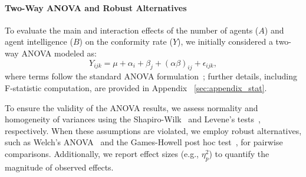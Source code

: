 \documentclass[11pt]{article}
\begin{document}
\paragraph{Two-Way ANOVA and Robust Alternatives}
To evaluate the main and interaction effects of the number of agents (\(A\)) and agent intelligence (\(B\)) on the conformity rate (\(Y\)), we initially considered a two-way ANOVA modeled as:
\[
Y_{ijk} = \mu + \alpha_i + \beta_j + (\alpha\beta)_{ij} + \epsilon_{ijk},
\]
where terms follow the standard ANOVA formulation~\citep{scheffe1999analysis}; further details, including F-statistic computation, are provided in Appendix ~\ref{sec:appendix_stat}.  







To ensure the validity of the ANOVA results, we assess normality and homogeneity of variances using the Shapiro-Wilk~\citep{shaphiro1965analysis} and Levene's tests~\citep{levene1960robust}, respectively. When these assumptions are violated, we employ robust alternatives, such as Welch's ANOVA~\citep{welch1951comparison} and the Games-Howell post hoc test~\citep{games1976pairwise}, for pairwise comparisons. Additionally, we report effect sizes (e.g., \(\eta_p^2\)) to quantify the magnitude of observed effects.
\end{document}
